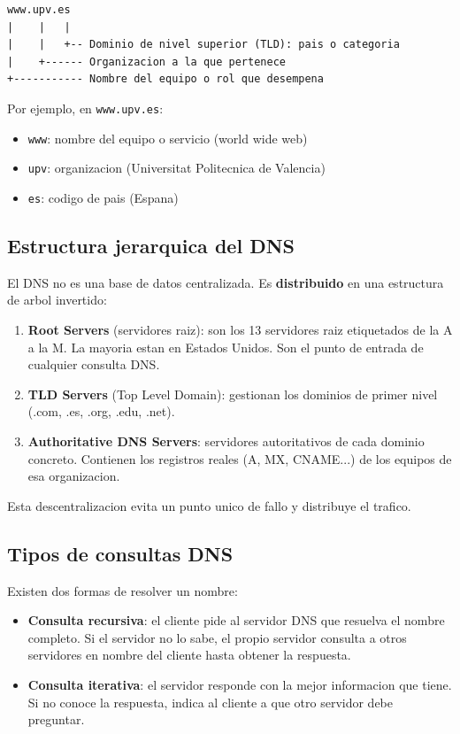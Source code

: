 \begin{verbatim}
www.upv.es
|    |   |
|    |   +-- Dominio de nivel superior (TLD): pais o categoria
|    +------ Organizacion a la que pertenece
+----------- Nombre del equipo o rol que desempena
\end{verbatim}

Por ejemplo, en \texttt{www.upv.es}:
\begin{itemize}
    \item \texttt{www}: nombre del equipo o servicio (world wide web)
    \item \texttt{upv}: organizacion (Universitat Politecnica de Valencia)
    \item \texttt{es}: codigo de pais (Espana)
\end{itemize}

\subsection{Estructura jerarquica del DNS}

El DNS no es una base de datos centralizada. Es \textbf{distribuido} en una
estructura de arbol invertido:

\begin{enumerate}
    \item \textbf{Root Servers} (servidores raiz): son los 13 servidores raiz
    etiquetados de la A a la M. La mayoria estan en Estados Unidos. Son el
    punto de entrada de cualquier consulta DNS.
    \item \textbf{TLD Servers} (Top Level Domain): gestionan los dominios de
    primer nivel (.com, .es, .org, .edu, .net).
    \item \textbf{Authoritative DNS Servers}: servidores autoritativos de cada
    dominio concreto. Contienen los registros reales (A, MX, CNAME...) de
    los equipos de esa organizacion.
\end{enumerate}

Esta descentralizacion evita un punto unico de fallo y distribuye el trafico.

\subsection{Tipos de consultas DNS}

Existen dos formas de resolver un nombre:

\begin{itemize}
    \item \textbf{Consulta recursiva}: el cliente pide al servidor DNS que resuelva
    el nombre completo. Si el servidor no lo sabe, el propio servidor consulta
    a otros servidores en nombre del cliente hasta obtener la respuesta.
    \item \textbf{Consulta iterativa}: el servidor responde con la mejor
    informacion que tiene. Si no conoce la respuesta, indica al cliente a que
    otro servidor debe preguntar.
\end{itemize}

